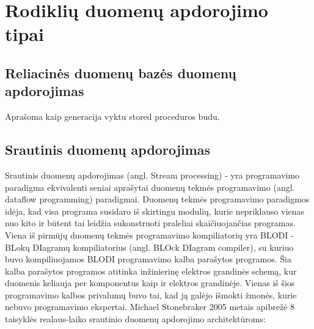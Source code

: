 \documentclass{VUMIFPSkursinis}
\begin{document}
\section{Rodiklių duomenų apdorojimo tipai}

\subsection{Reliacinės duomenų bazės duomenų apdorojimas}

Aprašoma kaip generacija vyktu stored proceduros budu.

\subsection{Srautinis duomenų apdorojimas}

    Srautinis duomenų apdorojimas (angl. Stream processing) - yra programavimo paradigma ekvivalenti seniai aprašytai duomenų tekmės programavimo (angl. dataflow programming) paradigmai\cite{shortstreamproc}. 
Duomenų tekmės programavimo paradigmos idėja, kad visa programa susidaro iš skirtingu modulių, kurie nepriklauso vienas nuo kito ir būtent tai leidžia sukonstruoti praleliai skaičiuojančias programas. 
Viena iš pirmūjų duomenų tekmės programavimo kompiliatorių yra BLODI - BLokų DIagramų kompiliatorius (angl. BLOck DIagram compiler), su kuriuo buvo kompiliuojamos BLODI programavimo kalba parašytos programos. 
Šia kalba parašytos programos atitinka inžinierinę elektros grandinės schemą, kur duomenis keliauja per komponentus kaip ir elektros grandinėje. Vienas iš šios programavimo kalbos privalumų buvo tai, 
kad ją galėjo išmokti žmonės, kurie nebuvo programavimo ekspertai\cite{kelly1961block}. 
Michael Stonebraker 2005 metais apibrežė 8 taisyklės realaus-laiko srautinio duomenų apdorojimo architektūroms\cite{stonebraker20058}:
\end{document}
